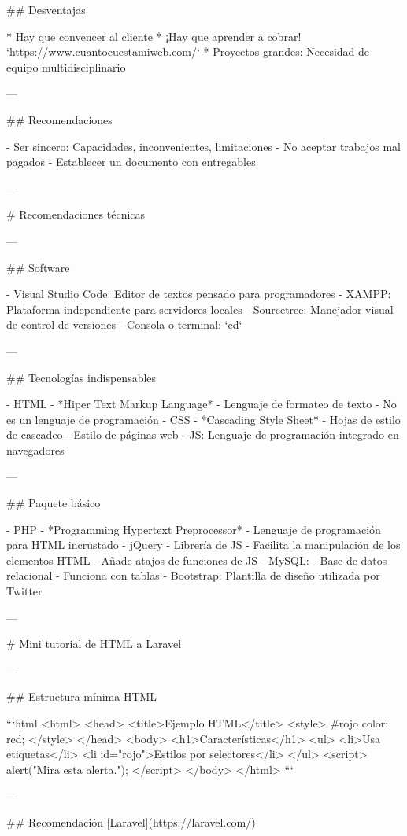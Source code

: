 ## Desventajas

* Hay que convencer al cliente
* ¡Hay que aprender a cobrar! `https://www.cuantocuestamiweb.com/`
* Proyectos grandes: Necesidad de equipo multidisciplinario

---

## Recomendaciones

- Ser sincero: Capacidades, inconvenientes, limitaciones
- No aceptar trabajos mal pagados
- Establecer un documento con entregables 

---

# Recomendaciones técnicas

---

## Software

- Visual Studio Code: Editor de textos pensado para programadores
- XAMPP: Plataforma independiente para servidores locales
- Sourcetree: Manejador visual de control de versiones
- Consola o terminal: `cd`

---

## Tecnologías indispensables

- HTML
	- *Hiper Text Markup Language*
	- Lenguaje de formateo de texto
	- No es un lenguaje de programación
- CSS
	- *Cascading Style Sheet*
	- Hojas de estilo de cascadeo
	- Estilo de páginas web
- JS: Lenguaje de programación integrado en navegadores

---

## Paquete básico

- PHP
	- *Programming Hypertext Preprocessor*
	- Lenguaje de programación para HTML incrustado
- jQuery
	- Librería de JS
	- Facilita la manipulación de los elementos HTML
	- Añade atajos de funciones de JS
- MySQL:
	- Base de datos relacional
	- Funciona con tablas
- Bootstrap: Plantilla de diseño utilizada por Twitter

---

# Mini tutorial de HTML a Laravel

---

## Estructura mínima HTML

```html
<html>
  <head>
    <title>Ejemplo HTML</title>
    <style>
      #rojo{
        color: red;
      }
   </style>
  </head>
  <body>
    <h1>Características</h1>
	<ul>
	  <li>Usa etiquetas</li>
	  <li id="rojo">Estilos por selectores</li>
	</ul>
	<script>
      alert("Mira esta alerta.");
	</script>
  </body>
</html>
```

---

## Recomendación [Laravel](https://laravel.com/)

